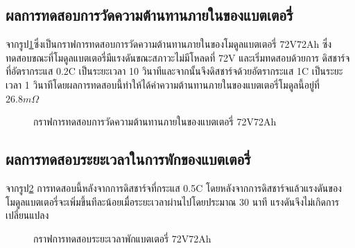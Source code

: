 \subsection{ผลการทดสอบการวัดความต้านทานภายในของแบตเตอรี่}
จากรูป\ref{fig:DCIR_Test}ซึ่งเป็นกราฟการทดสอบการวัดความต้านทานภายในของโมดูลแบตเตอรี่ 72V72Ah ซึ่งทดสอบขณะที่โมดูลแบตเตอรี่มีแรงดันขณะสภาวะไม่มีโหลดที่ 72V และเริ่มทดสอบด้วยการ
ดิสชาร์จที่อัตรากระแส 0.2C เป็นระยะเวลา 10 วินาทีและจากนั้นจึงดิสชาร์จด้วยอัตรากระแส 1C เป็นระยะเวลา 1 วินาทีโดยผลการทดสอบนี้ทำให้ได้ค่าความต้านทานภายในของแบตเตอรี่โมดูลนี้อยู่ที่ $26.8m\Omega$
\begin{center}
	\begin{figure}[H]
		\centering
		\captionsetup{justification=centering,margin=2cm}
		\caption{กราฟการทดสอบการวัดความต้านทานภายในของแบตเตอรี่ 72V72Ah}
		\label{fig:DCIR_Test}
	\end{figure}
\end{center}
\pagebreak
\subsection{ผลการทดสอบระยะเวลาในการพักของแบตเตอรี่}
จากรูป\ref{fig:Rest_Test} การทดสอบนี้หลังจากการดิสชาร์จที่กระแส 0.5C โดยหลังจากการดิสชาร์จแล้วแรงดันของโมดูลแบตเตอรี่จะเพิ่มขึ้นทีละน้อยเมื่อระยะเวลาผ่านไปโดยประมาณ 30 นาที
แรงดันจึงไม่เกิดการเปลี่ยนแปลง
\begin{center}
	\begin{figure}[H]
		\centering
		\captionsetup{justification=centering,margin=2cm}
		\caption{กราฟการทดสอบระยะเวลาพักแบตเตอรี่ 72V72Ah}
		\label{fig:Rest_Test}
	\end{figure}
\end{center}
\pagebreak

